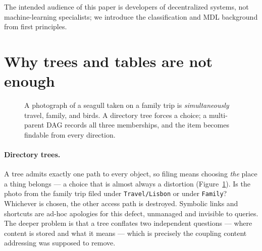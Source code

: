 \documentclass[10pt,twocolumn]{article}
\begin{document}
The intended audience of this paper is developers of decentralized
systems, not machine-learning specialists; we introduce the classification
and MDL background from first principles.

\section{Why trees and tables are not enough}
\label{sec:trees}

\begin{figure}[t]
\centering
{}
\caption{A photograph of a seagull taken on a family trip is
\emph{simultaneously} travel, family, and birds. A directory tree forces a
choice; a multi-parent DAG records all three memberships, and the item
becomes findable from every direction.}
\label{fig:treevsdag}
\end{figure}

\paragraph{Directory trees.}
A tree admits exactly one path to every object, so filing means choosing
\emph{the} place a thing belongs --- a choice that is almost always a
distortion (Figure~\ref{fig:treevsdag}). Is the photo from the family trip
filed under \texttt{Travel/Lisbon} or under \texttt{Family}? Whichever is
chosen, the other access path is destroyed. Symbolic links and shortcuts
are ad-hoc apologies for this defect, unmanaged and invisible to queries.
The deeper problem is that a tree conflates two independent questions ---
where content is stored and what it means --- which is precisely the
coupling content addressing was supposed to remove.
\end{document}
